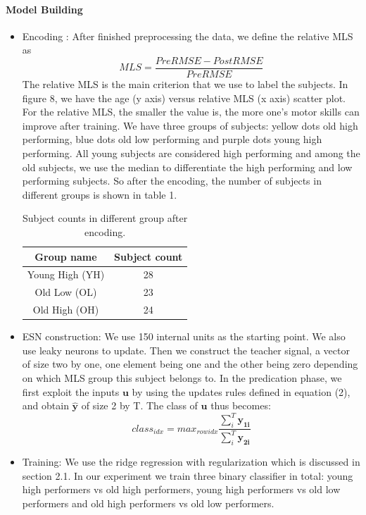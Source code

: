 \documentclass[a4paper,11pt,oneside]{article}
\begin{document}
\paragraph{Model Building} 

\begin{itemize}
	\item Encoding : After finished preprocessing the data, we define the relative MLS as $$ MLS = \frac{PreRMSE - PostRMSE}{PreRMSE}  $$
	The relative MLS is the main criterion that we use to label the subjects.   
	In figure 8, we have the age (y axis) versus relative MLS (x axis) scatter plot.  For the relative MLS, the smaller the value is, the more one's motor skills can improve after training. We have three groups of subjects: yellow dots old high performing, blue dots old low performing and purple dots young high performing. All young subjects are considered high performing and among the old subjects, we use the median to differentiate the high performing and low performing subjects. So after the encoding, the number of subjects in different groups is shown in table 1.
	
	\begin{table}[h]
		\centering
		\begin{tabular}{||c c ||} 
			\hline
			Group name & Subject count  \\ [0.5ex] 
			\hline\hline
			Young High (YH)  & 28 \\ 
			Old Low (OL) & 23  \\
			Old High (OH) & 24  \\ [0.5ex] 
			\hline
		\end{tabular}
		\caption{Subject counts in different group after encoding.}
	\end{table}
	
	\item ESN construction:  We use 150 internal units as the starting point. We also use leaky neurons to update. Then we construct the teacher signal, a vector of size two by one, one element being one and the other being zero depending on which MLS group this subject belongs to. In the predication phase, we first exploit the inputs $\mathbf{u}$ by using the updates rules defined in equation (2), and obtain $\hat{\mathbf{y}}$ of size 2 by T. The class of $\mathbf{u}$ thus becomes:
	$$ class_{idx} = max_{rowidx} \frac{\sum_i^T\mathbf{y_{1i}}}{\sum_i^T\mathbf{y_{2i}}} $$
	
	\item Training: We use the ridge regression with regularization which is discussed in section 2.1. In our experiment we train three binary classifier in total: young high performers vs old high performers, young high performers vs old low performers and old high performers vs old low performers.
	
\end{itemize}
\end{document}
